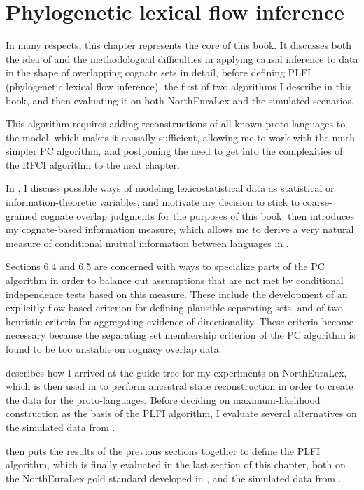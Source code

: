\chapter{Phylogenetic lexical flow inference}\label{sec:6}
In many respects, this chapter represents the core of this book. It discusses both the idea of and the methodological difficulties in applying causal inference to data in the shape of overlapping cognate sets in detail, before defining PLFI (phylogenetic lexical flow inference), the first of two algorithms I describe in this book, and then evaluating it on both NorthEuraLex and the simulated scenarios.

This algorithm requires adding reconstructions of all known proto-languages to the model, which makes it causally sufficient, allowing me to work with the much simpler PC algorithm, and postponing the need to get into the complexities of the RFCI algorithm to the next chapter.

In , I discuss possible ways of modeling lexicostatistical data as statistical or information-theoretic variables, and motivate my decision to stick to coarse-grained cognate overlap judgments for the purposes of this book.  then introduces my cognate-based information measure, which allows me to derive a very natural measure of conditional mutual information between languages in .

Sections 6.4 and 6.5 are concerned with ways to specialize parts of the PC algorithm in order to balance out assumptions that are not met by conditional independence tests based on this measure. These include the development of an explicitly flow-based criterion for defining plausible separating sets, and of two heuristic criteria for aggregating evidence of directionality. These criteria become necessary because the separating set membership criterion of the PC algorithm is found to be too unstable on cognacy overlap data.

 describes how I arrived at the guide tree for my experiments on North\-Eu\-ra\-Lex, which is then used in  to perform ancestral state reconstruction in order to create the data for the proto-languages. Before deciding on maximum-likelihood construction as the basis of the PLFI algorithm, I evaluate several alternatives on the simulated data from .

 then puts the results of the previous sections together to define the PLFI algorithm, which is finally evaluated in the last section of this chapter, both on the NorthEuraLex gold standard developed in , and the simulated data from .

